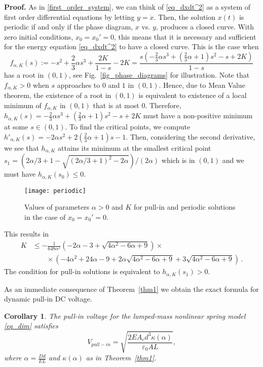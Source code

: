 \documentclass[review]{elsarticle}
\newtheorem{corollary}[theorem]{Corollary}
\newenvironment{proof}[1][Proof]{\textbf{#1.} }{\hfill \raisebox{-0.1em}{$\Box$}\\}
\begin{document}
\begin{proof}
	As in \eqref{first_order_system}, we can think of \eqref{eq_dxdt^2} as a system of first order differential equations by letting $y=\dot x$. Then, the solution $x(t)$ is periodic if and only if the phase diagram, $x$ vs. $y$, produces a closed curve. With zero initial conditions, $x_0=x_0'=0$, this means that it is necessary and sufficient for the energy equation \eqref{eq_dxdt^2} to have a closed curve. This is the case when
\[
f_{\alpha,K}(s):=-s^2 + \frac{2}{3}\alpha s^3+\frac{2K}{1-s}-2K
=\frac{s(-\frac{2}{3}\alpha s^3+(\frac{2}{3}\alpha +1)s^2-s+2K)}{1-s}
\]
has a root in $(0,1)$, see Fig.~\ref{fig_phase_diagrams} for illustration. Note that $f_{\alpha,K}>0$ when $s$ approaches to $0$ and $1$ in $(0,1)$. Hence, due to Mean Value theorem, the existence of a root in $(0,1)$ is equivalent to existence of a local minimum of $f_{\alpha,K}$ in $(0,1)$ that is at most 0.   
Therefore, $h_{\alpha,K}(s)= -\frac{2}{3}\alpha s^3+(\frac{2}{3}\alpha +1)s^2-s+2K$ must have a non-positive minimum at some $s\in (0,1)$. To find the critical points, we compute $h'_{\alpha,K}(s)=-2\alpha s^2+2(\frac{2}{3}\alpha+1)s-1$. Then, considering the second derivative, we see that $h_{\alpha,K}$ attains its minimum at the smallest critical point $s_1=(2\alpha/3+1-\sqrt{(2\alpha/3+1)^2-2\alpha})/(2\alpha)$ which is in $(0,1)$ and we must have $h_{\alpha,K}(s_0) \le 0.$ 
\begin{figure}[htb]
\begin{center}
    \texttt{[image: periodic]}
\caption{Values of parameters $\alpha>0$ and $K$ for pull-in and periodic solutions in the case of $x_0=x_0'=0$.}\label{fig_periodic}
  \end{center}
\end{figure}
This results in
\begin{equation*}
\begin{split}
K&\le -\frac{1}{648\alpha^2}(-2\alpha-3+\sqrt{4\alpha^2-6\alpha+9})\times\\
&\qquad \times (-4\alpha^2+24\alpha-9+2\alpha\sqrt{4\alpha^2-6\alpha+9}+3\sqrt{4\alpha^2-6\alpha+9})\,.
\end{split}
\end{equation*}
The condition for pull-in solutions is equivalent to $h_{\alpha,K}(s_1)>0$.
\end{proof}

As an immediate consequence of Theorem~\ref{thm1} we obtain the exact formula for dynamic pull-in DC voltage.
\begin{corollary}
The pull-in voltage for the lumped-mass nonlinear spring model \eqref{eq_dim} satisfies
$$V_{pull-in}=\sqrt{\frac{2E A_c d^3\kappa(\alpha)}{\varepsilon_0 A L}},$$
where $\alpha=\frac{Dd}{EL}$ and $\kappa(\alpha)$ as in Theorem~\ref{thm1}.
\end{corollary}
\end{document}
